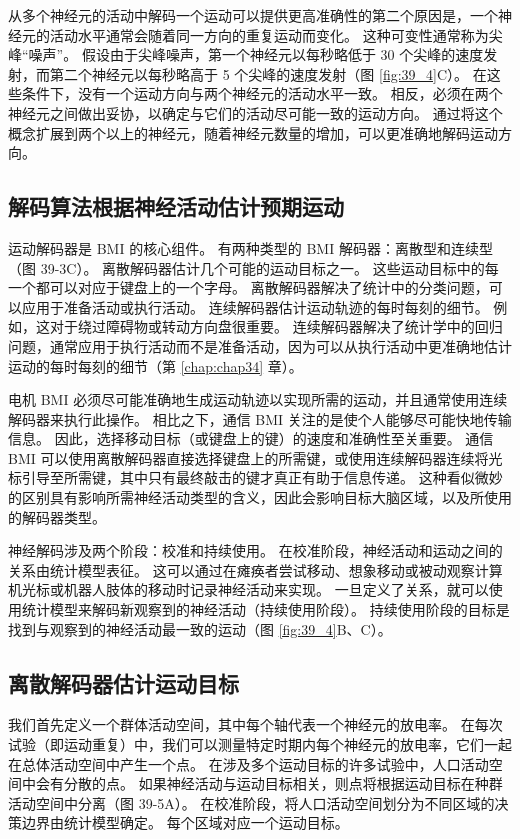 从多个神经元的活动中解码一个运动可以提供更高准确性的第二个原因是，一个神经元的活动水平通常会随着同一方向的重复运动而变化。 
这种可变性通常称为尖峰“噪声”。 
假设由于尖峰噪声，第一个神经元以每秒略低于 30 个尖峰的速度发射，而第二个神经元以每秒略高于 5 个尖峰的速度发射（图 \ref{fig:39_4}C）。 
在这些条件下，没有一个运动方向与两个神经元的活动水平一致。 
相反，必须在两个神经元之间做出妥协，以确定与它们的活动尽可能一致的运动方向。 
通过将这个概念扩展到两个以上的神经元，随着神经元数量的增加，可以更准确地解码运动方向。

\subsection{解码算法根据神经活动估计预期运动}
运动解码器是 BMI 的核心组件。 
有两种类型的 BMI 解码器：离散型和连续型（图 39-3C）。 
离散解码器估计几个可能的运动目标之一。 
这些运动目标中的每一个都可以对应于键盘上的一个字母。 
离散解码器解决了统计中的分类问题，可以应用于准备活动或执行活动。 
连续解码器估计运动轨迹的每时每刻的细节。 
例如，这对于绕过障碍物或转动方向盘很重要。 
连续解码器解决了统计学中的回归问题，通常应用于执行活动而不是准备活动，因为可以从执行活动中更准确地估计运动的每时每刻的细节（第 \ref{chap:chap34} 章）。


电机 BMI 必须尽可能准确地生成运动轨迹以实现所需的运动，并且通常使用连续解码器来执行此操作。 
相比之下，通信 BMI 关注的是使个人能够尽可能快地传输信息。 
因此，选择移动目标（或键盘上的键）的速度和准确性至关重要。 
通信 BMI 可以使用离散解码器直接选择键盘上的所需键，或使用连续解码器连续将光标引导至所需键，其中只有最终敲击的键才真正有助于信息传递。 
这种看似微妙的区别具有影响所需神经活动类型的含义，因此会影响目标大脑区域，以及所使用的解码器类型。


神经解码涉及两个阶段：校准和持续使用。 
在校准阶段，神经活动和运动之间的关系由统计模型表征。 
这可以通过在瘫痪者尝试移动、想象移动或被动观察计算机光标或机器人肢体的移动时记录神经活动来实现。 
一旦定义了关系，就可以使用统计模型来解码新观察到的神经活动（持续使用阶段）。 
持续使用阶段的目标是找到与观察到的神经活动最一致的运动（图 \ref{fig:39_4}B、C）。



\subsection{离散解码器估计运动目标}
我们首先定义一个群体活动空间，其中每个轴代表一个神经元的放电率。 
在每次试验（即运动重复）中，我们可以测量特定时期内每个神经元的放电率，它们一起在总体活动空间中产生一个点。 
在涉及多个运动目标的许多试验中，人口活动空间中会有分散的点。 
如果神经活动与运动目标相关，则点将根据运动目标在种群活动空间中分离（图 39-5A）。 
在校准阶段，将人口活动空间划分为不同区域的决策边界由统计模型确定。 每个区域对应一个运动目标。

